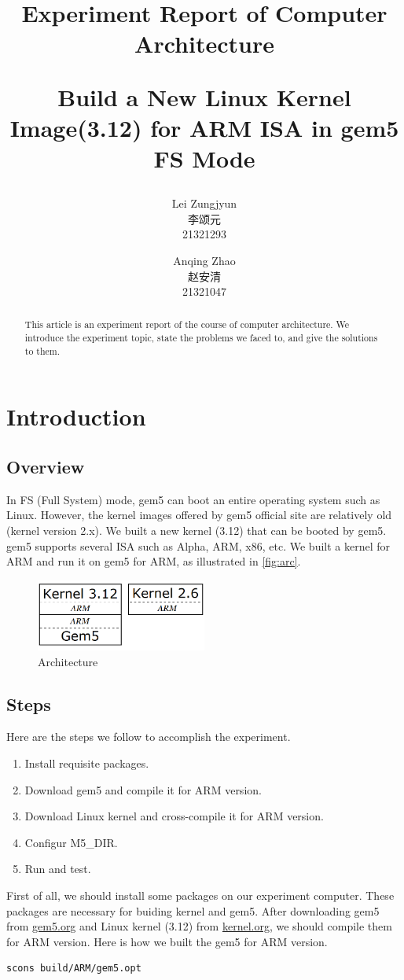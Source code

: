 \documentclass[utf8,a4paper]{article}
\title{\textbf{\sffamily Experiment Report of Computer Architecture}\\  \begin{large}\sffamily Build a New Linux Kernel Image(3.12) for ARM ISA in gem5 FS Mode \end{large}
}
\author{Lei Zungjyun\\李颂元\\21321293 \and Anqing Zhao\\赵安清\\21321047}
\begin{document}
\maketitle

\begin{abstract}
This article is an experiment report of the course of computer architecture. We introduce the experiment topic, state the problems we faced to, and give the solutions to them.
\end{abstract}

\section{Introduction}
	\subsection{Overview}
	In FS (Full System) mode, gem5 can boot an entire operating system such as Linux. However, the kernel images offered by gem5 official site are relatively old (kernel version 2.x). We built a new kernel (3.12) that can be booted by gem5. gem5 supports several ISA such as Alpha, ARM, x86, etc. We built a kernel for ARM and run it on gem5 for ARM, as illustrated in \autoref{fig:arc}.


	\begin{figure}[htbp]
		\centering
		\includegraphics[width=0.5\textwidth]{images/arch2.png}
		\caption{Architecture}\label{fig:arc}	%
	\end{figure}
	\subsection{Steps}\label{text:steps}
		Here are the steps we follow to accomplish the experiment.
		\begin{enumerate}
			\item
			Install requisite packages.
			\item
			Download gem5 and compile it for ARM version.
			\item
			Download Linux kernel and cross-compile it for ARM version.
			\item
			Configur M5\_DIR.
			\item
			Run and test.
		\end{enumerate}
		First of all, we should install some packages on our experiment computer. These packages are necessary for buiding kernel and gem5. After downloading gem5 from \url{gem5.org} and Linux kernel (3.12) from \url{kernel.org}, we should compile them for ARM version. Here is how we built the gem5 for ARM version.
\begin{lstlisting}[language=bash, frame=shadowbox]
scons build/ARM/gem5.opt 
\end{lstlisting}
\end{document}
